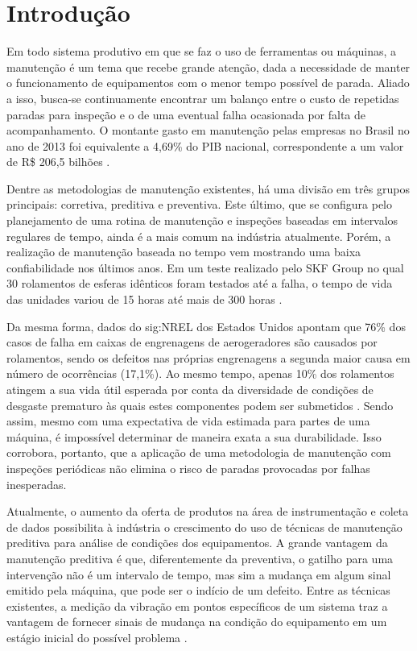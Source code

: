 \documentclass[12pt,oneside,english,brazil,lmodern,siglas,simbolos,cite=num]{ucsmonograph}
\begin{document}
	
	\textual %
	
	\chapter{Introdução}
	Em todo sistema produtivo em que se faz o uso de ferramentas ou máquinas, a manutenção é um tema que recebe grande atenção, dada a necessidade de manter o funcionamento de equipamentos com o menor tempo possível de parada.
	Aliado a isso, busca-se continuamente encontrar um balanço entre o custo de repetidas paradas para inspeção e o de uma eventual falha ocasionada por falta de acompanhamento.
	O montante gasto em manutenção pelas empresas no Brasil no ano de 2013 foi equivalente a 4,69\% do PIB nacional, correspondente a um valor de R\$ 206,5 bilhões \cite{seleme:2015}.
	
	Dentre as metodologias de manutenção existentes, há uma divisão em três grupos principais: corretiva, preditiva e preventiva.
	Este último, que se configura pelo planejamento de uma rotina de manutenção e inspeções baseadas em intervalos regulares de tempo, ainda é a mais comum na indústria atualmente.
	Porém, a realização de manutenção baseada no tempo vem mostrando uma baixa confiabilidade nos últimos anos.
	Em um teste realizado pelo SKF Group no qual 30 rolamentos de esferas idênticos foram testados até a falha, o tempo de vida das unidades variou de 15 horas até mais de 300 horas \cite{hashemian:2011}.
	 
	Da mesma forma, dados do \gls{sig:NREL} dos Estados Unidos apontam que 76\% dos casos de falha em caixas de engrenagens de aerogeradores são causados por rolamentos, sendo os defeitos nas próprias engrenagens a segunda maior causa em número de ocorrências (17,1\%).
	Ao mesmo tempo, apenas 10\% dos rolamentos atingem a sua vida útil esperada por conta da diversidade de condições de desgaste prematuro às quais estes componentes podem ser submetidos \cite{peeters:2018}.
	Sendo assim, mesmo com uma expectativa de vida estimada para partes de uma máquina, é impossível determinar de maneira exata a sua durabilidade.
	Isso corrobora, portanto, que a aplicação de uma metodologia de manutenção com inspeções periódicas não elimina o risco de paradas provocadas por falhas inesperadas.
	
	Atualmente, o aumento da oferta de produtos na área de instrumentação e coleta de dados possibilita à indústria o crescimento do uso de técnicas de manutenção preditiva para análise de condições dos equipamentos.
	A grande vantagem da manutenção preditiva é que, diferentemente da preventiva, o gatilho para uma intervenção não é um intervalo de tempo, mas sim a mudança em algum sinal emitido pela máquina, que pode ser o indício de um defeito.
	Entre as técnicas existentes, a medição da vibração em pontos específicos de um sistema traz a vantagem de fornecer sinais de mudança na condição do equipamento em um estágio inicial do possível problema \cite{al-najjar:2004}.
	
\end{document}
